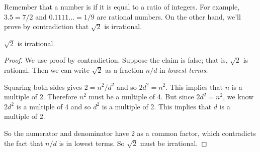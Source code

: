 Remember that a number is  if it is equal to a ratio
of integers.  For example, $3.5 = 7/2$ and $0.1111\dots = 1/9$ are
rational numbers.  On the other hand, we'll prove by contradiction
that $\sqrt{2}$ is irrational.

\begin{theorem}\label{thm:sqrt2irr_by_contra}
$\sqrt{2}$ is irrational.
\end{theorem}

\begin{proof}
We use proof by contradiction.  Suppose the claim is false; that is,
$\sqrt{2}$ is rational.  Then we can write $\sqrt{2}$ as a fraction
$n/d$ in \textit{lowest terms}.

Squaring both sides gives $2 = n^2 / d^2$ and so $2 d^2 = n^2$.  This
implies that $n$ is a multiple of $2$.  Therefore $n^2$ must be a multiple
of 4.  But since $2d^2 = n^2$, we know $2 d^2$ is a multiple of 4 and so
$d^2$ is a multiple of 2.  This implies that $d$ is a multiple of $2$.

So the numerator and denominator have 2 as a common factor, which
contradicts the fact that $n/d$ is in lowest terms.  So $\sqrt{2}$ must be
irrational.
\end{proof}

